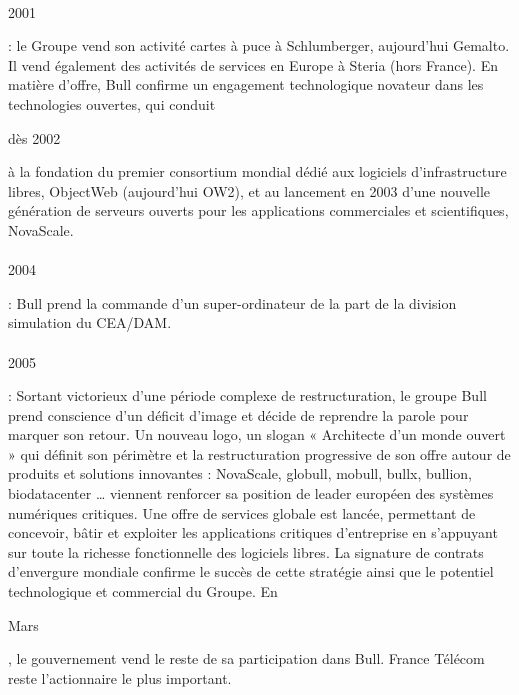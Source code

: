 \documentclass{article}
\begin{document}
		\paragraph{}
		\begin{bf}2001\end{bf} : le Groupe vend son activité cartes à puce à Schlumberger, aujourd'hui Gemalto. Il vend 
		également des activités de services en Europe à Steria (hors France).
		En matière d’offre, Bull confirme un engagement technologique novateur dans les technologies ouvertes, qui conduit 
		\begin{bf}dès 2002\end{bf} à la fondation du premier consortium mondial dédié aux logiciels d’infrastructure libres, 
		ObjectWeb (aujourd’hui OW2), et au lancement en 2003 d’une nouvelle génération de serveurs ouverts pour les 
		applications commerciales et scientifiques, NovaScale.
		\paragraph{}
		\begin{bf}2004\end{bf} : Bull prend la commande d'un super-ordinateur de la part de la division simulation du CEA/DAM.
		\paragraph{}
		\begin{bf}2005\end{bf} : Sortant victorieux d’une période complexe de restructuration, le groupe Bull prend 
		conscience d’un déficit d’image et décide de reprendre la parole pour marquer son retour. Un nouveau logo, un slogan 
		« Architecte d’un monde ouvert » qui définit son périmètre et la restructuration progressive de son offre autour de 
		produits et solutions innovantes : NovaScale, globull, mobull, bullx, bullion, biodatacenter … viennent renforcer sa 
		position de leader européen des systèmes numériques critiques.
		Une offre de services globale est lancée, permettant de concevoir, bâtir et exploiter les applications critiques 
		d’entreprise en s’appuyant sur toute la richesse fonctionnelle des logiciels libres. La signature de contrats 
		d’envergure mondiale confirme le succès de cette stratégie ainsi que le potentiel technologique et commercial du Groupe.
		\newline
		En \begin{bf}Mars\end{bf}, le gouvernement vend le reste de sa participation dans Bull. France Télécom reste 
		l'actionnaire le plus important.
\end{document}
